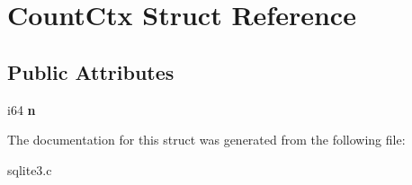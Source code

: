 \hypertarget{struct_count_ctx}{\section{Count\-Ctx Struct Reference}
\label{struct_count_ctx}
}
\subsection*{Public Attributes}
\begin{DoxyCompactItemize}
\item 
\hypertarget{struct_count_ctx_a141c718918dbfaa183f772bfd7a516f4}{i64 {\bfseries n}}\label{struct_count_ctx_a141c718918dbfaa183f772bfd7a516f4}

\end{DoxyCompactItemize}


The documentation for this struct was generated from the following file\-:\begin{DoxyCompactItemize}
\item 
sqlite3.\-c\end{DoxyCompactItemize}
